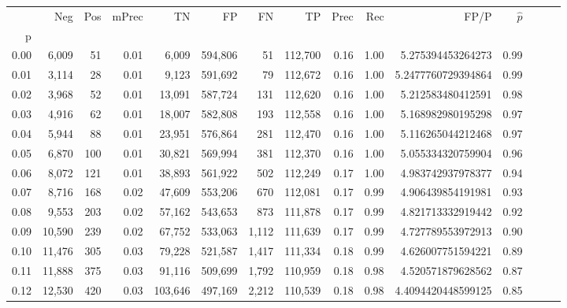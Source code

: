 \begin{tabular}{rrrrrrrrrrrrrrr}
\toprule
{} &     Neg &    Pos & mPrec &       TN &       FP &       FN &       TP &  Prec &   Rec &                  FP/P & $\hat{p}$ \\
p    &         &        &       &          &          &          &          &       &       &                       &           \\
\midrule
0.00 &   6,009 &     51 &  0.01 &    6,009 &  594,806 &       51 &  112,700 &  0.16 &  1.00 &     5.275394453264273 &      0.99 \\
0.01 &   3,114 &     28 &  0.01 &    9,123 &  591,692 &       79 &  112,672 &  0.16 &  1.00 &    5.2477760729394864 &      0.99 \\
0.02 &   3,968 &     52 &  0.01 &   13,091 &  587,724 &      131 &  112,620 &  0.16 &  1.00 &     5.212583480412591 &      0.98 \\
0.03 &   4,916 &     62 &  0.01 &   18,007 &  582,808 &      193 &  112,558 &  0.16 &  1.00 &     5.168982980195298 &      0.97 \\
0.04 &   5,944 &     88 &  0.01 &   23,951 &  576,864 &      281 &  112,470 &  0.16 &  1.00 &     5.116265044212468 &      0.97 \\
0.05 &   6,870 &    100 &  0.01 &   30,821 &  569,994 &      381 &  112,370 &  0.16 &  1.00 &     5.055334320759904 &      0.96 \\
0.06 &   8,072 &    121 &  0.01 &   38,893 &  561,922 &      502 &  112,249 &  0.17 &  1.00 &     4.983742937978377 &      0.94 \\
0.07 &   8,716 &    168 &  0.02 &   47,609 &  553,206 &      670 &  112,081 &  0.17 &  0.99 &     4.906439854191981 &      0.93 \\
0.08 &   9,553 &    203 &  0.02 &   57,162 &  543,653 &      873 &  111,878 &  0.17 &  0.99 &     4.821713332919442 &      0.92 \\
0.09 &  10,590 &    239 &  0.02 &   67,752 &  533,063 &    1,112 &  111,639 &  0.17 &  0.99 &     4.727789553972913 &      0.90 \\
0.10 &  11,476 &    305 &  0.03 &   79,228 &  521,587 &    1,417 &  111,334 &  0.18 &  0.99 &     4.626007751594221 &      0.89 \\
0.11 &  11,888 &    375 &  0.03 &   91,116 &  509,699 &    1,792 &  110,959 &  0.18 &  0.98 &     4.520571879628562 &      0.87 \\
0.12 &  12,530 &    420 &  0.03 &  103,646 &  497,169 &    2,212 &  110,539 &  0.18 &  0.98 &    4.4094420448599125 &      0.85 \\

\end{tabular}
